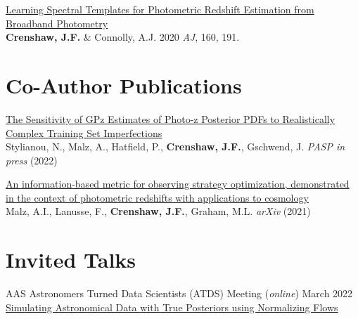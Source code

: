 \documentclass[margin]{res}
\newcommand{\paper}[2]{\href{#1}{\sc #2}}
\begin{document}
\begin{resume}
\begin{etaremune}[leftmargin=0pt]

\item \paper{https://ui.adsabs.harvard.edu/abs/2020AJ....160..191C/abstract}{Learning Spectral Templates for Photometric Redshift Estimation from Broadband Photometry} \\
\textbf{Crenshaw, J.F.} \& Connolly, A.J. 2020 \textit{AJ}, 160, 191.

\end{etaremune}

\section{Co-Author Publications}

\begin{etaremune}[leftmargin=0pt]

\item \paper{https://ui.adsabs.harvard.edu/abs/2022arXiv220212775S/abstract}{The Sensitivity of GPz Estimates of Photo-z Posterior PDFs to Realistically Complex Training Set Imperfections} \\
Stylianou, N., Malz, A., Hatfield, P., \textbf{Crenshaw, J.F.}, Gschwend, J. \textit{PASP in press} (2022)

\item \paper{https://arxiv.org/abs/2104.08229}{An information-based metric for observing strategy optimization, demonstrated in the context of photometric redshifts with applications to cosmology} \\
Malz, A.I., Lanusse, F., \textbf{Crenshaw, J.F.}, Graham, M.L. \textit{arXiv} (2021)

\end{etaremune}

\section{Invited Talks}

\hangindent=2mm
AAS Astronomers Turned Data Scientists (ATDS) Meeting (\textit{online}) \hfill March 2022 \\
\href{https://docs.google.com/presentation/d/18cWynQW9p8bEPS6NMueZ4mKaEEmNdxUPhsXArGV5Cb8/edit?usp=sharing}{Simulating Astronomical Data with True Posteriors using Normalizing Flows}


\end{resume}
\end{document}
